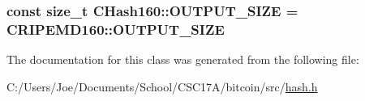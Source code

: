 \subsubsection[{O\+U\+T\+P\+U\+T\+\_\+\+S\+I\+Z\+E}]{\setlength{\rightskip}{0pt plus 5cm}const size\+\_\+t C\+Hash160\+::\+O\+U\+T\+P\+U\+T\+\_\+\+S\+I\+Z\+E = C\+R\+I\+P\+E\+M\+D160\+::\+O\+U\+T\+P\+U\+T\+\_\+\+S\+I\+Z\+E\hspace{0.3cm}{\ttfamily [static]}}\label{class_c_hash160_a1a5618e17d91ea96e86d779f575211eb}


The documentation for this class was generated from the following file\+:\begin{DoxyCompactItemize}
\item 
C\+:/\+Users/\+Joe/\+Documents/\+School/\+C\+S\+C17\+A/bitcoin/src/\hyperlink{hash_8h}{hash.\+h}\end{DoxyCompactItemize}
